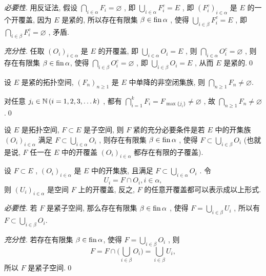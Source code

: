 	\begin{Proof}
		\textsl{必要性}. 用反证法, 假设 $ \bigcap_{i\in\alpha}F_{i}=\varnothing $ , 即 $ \bigcup_{i\in\alpha}F_{i}^{c}=E $ , 即 $ (F_{i}^{c})_{i\in\alpha} $ 是 $ E $ 的一个开覆盖, 因为 $ E $ 是紧的,  所以存在有限集 $ \beta\in\operatorname{fin}\alpha $ ,  使得 $ \bigcup_{i\in\beta}F_{i}^{c}=E $ , 即 $ \bigcap_{i\in\beta}F_{i}^{c}=\varnothing $ , 矛盾.

		\textsl{充分性}. 任取 $ (O_{i})_{i\in\alpha} $ 是 $ E $ 的开覆盖, 即 $ \bigcup_{i\in\alpha}O_{i}=E $ , 则 $ \bigcap_{i\in\alpha}O_{i}^{c}=\varnothing $ , 则存在有限集 $ \beta\in\operatorname{fin} \alpha $, 使得 $ \bigcap_{i\in\beta}O_{i}^{c}=\varnothing $ , 即 $ \bigcup_{i\in\beta}O_{i}=E $ , 从而 $ E $ 是紧的.\qed
	\end{Proof}

	\begin{Proposition}
		设 $ E $ 是紧的拓扑空间, $ (F_{n})_{n\geqslant1} $ 是 $ E $ 中单降的非空闭集族, 则 $ \bigcap_{n\geqslant1}F_{n}\neq\varnothing $.
	\end{Proposition}

	\begin{Proof}
		对任意 $ j_{i}\in\mathbb{N}\,(i=1, 2, 3,\dots k) $ , 都有 $ \bigcap_{i=1}^{k}F_{i}=F_{\max\{ j_{i} \}}\neq\varnothing $ , 故 $ \bigcap_{n\geqslant1}F_{n}\neq\varnothing $ .\qed
	\end{Proof}

	\begin{Theorem}
		 设 $ E $ 是拓扑空间,  $ F\subset E $ 是子空间, 则 $ F $ 紧的充分必要条件是若 $ E $ 中的开集族 $ (O_{i})_{i\in\alpha} $ 满足 $ F\subset \bigcup_{i\in\alpha}O_{i} $ , 则存在有限集 $ \beta\in\operatorname{fin}\alpha $ , 使得 $ F\subset\bigcup_{i\in\beta}O_{i} $ (也就是说, $ F $ 任一在 $ E $ 中的开覆盖 $ (O_{i})_{i\in\alpha} $ 都存在有限的子覆盖).
	\end{Theorem}

	\begin{Proof}
		设 $ F\subset E $ , $ (O_{i})_{i\in\alpha} $ 是 $ E $ 中的开集族, 且满足 $ F\subset \bigcup_{i\in\alpha}O_{i} $ . 令
		\[
			U_{i}=F\cap O_{i}, i\in\alpha,
		\]
		则 $ (U_{i})_{i\in\alpha} $ 是空间 $ F $ 上的开覆盖, 反之,  $ F $ 的任意开覆盖都可以表示成以上形式.

		\textsl{必要性}. 若 $ F $ 是紧子空间, 那么存在有限集 $ \beta\in\operatorname{fin}\alpha $ , 使得 $ F=\bigcup_{i\in\beta}U_{i} $ , 所以有 $ F\subset\bigcup_{i\in\beta}O_{i} $.

		\textsl{充分性}. 若存在有限集 $ \beta\in\operatorname{fin}\alpha $, 使得 $ F=\bigcup_{i\in\beta}O_{i} $ , 则
		\[
			F=F\cap\bigg( \bigcup_{i\in\beta}O_{i} \bigg)=\bigcup_{i\in\beta}U_{i},
		\]
		所以 $ F $ 是紧子空间.\qed
	\end{Proof}

